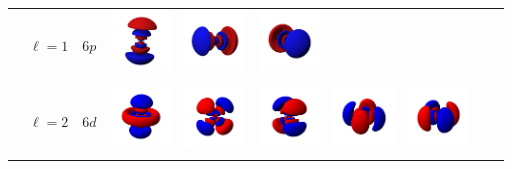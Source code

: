 \begin{landscape}
\begin{xltabular}{\linewidth}{C C C c c c c c c c}
&  &  & 
\includegraphics[width=1.6cm]{tableau_geometrie_orbitale_modelisation/P6z.png} 
&
\includegraphics[width=1.6cm]{tableau_geometrie_orbitale_modelisation/P6x.png}  
&
\includegraphics[width=1.6cm]{tableau_geometrie_orbitale_modelisation/P6y.png} 
& & & & \\

& & &  &  &  & & & &  \\ %

\addlinespace

 &  &  & 
\includegraphics[width=1.6cm]{tableau_geometrie_orbitale_modelisation/D6z2.png} 
&
\includegraphics[width=1.6cm]{tableau_geometrie_orbitale_modelisation/D6xz.png}  
&
\includegraphics[width=1.6cm]{tableau_geometrie_orbitale_modelisation/D6yz.png} 
& 
\includegraphics[width=1.6cm]{tableau_geometrie_orbitale_modelisation/D6xy.png} 
&
\includegraphics[width=1.6cm]{tableau_geometrie_orbitale_modelisation/D6x2-y2.png} 
& & \\
& & &  &  &  &  &  & &  \\ %


\end{xltabular}
\end{landscape}

